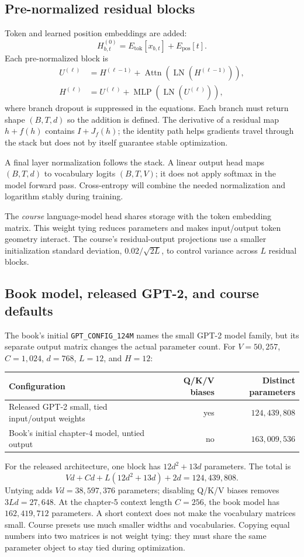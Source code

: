 \documentclass[11pt]{article}
\begin{document}
\subsection{Pre-normalized residual blocks}

Token and learned position embeddings are added:
\[
H^{(0)}_{b,t}=E_{\mathrm{tok}}[x_{b,t}]+E_{\mathrm{pos}}[t].
\]
Each pre-normalized block is
\begin{align*}
U^{(\ell)} &= H^{(\ell-1)}+\operatorname{Attn}
(\operatorname{LN}(H^{(\ell-1)})),\\
H^{(\ell)} &= U^{(\ell)}+\operatorname{MLP}
(\operatorname{LN}(U^{(\ell)})),
\end{align*}
where branch dropout is suppressed in the equations. Each branch must return
shape $(B,T,d)$ so the addition is defined. The derivative of a residual map
$h+f(h)$ contains $I+J_f(h)$; the identity path helps gradients travel through
the stack but does not by itself guarantee stable optimization.


A final layer normalization follows the stack. A linear output head maps
$(B,T,d)$ to vocabulary logits $(B,T,V)$; it does not apply softmax in the model
forward pass. Cross-entropy will combine the needed normalization and logarithm
stably during training.

The \emph{course} language-model head shares storage with the token embedding matrix. This
weight tying reduces parameters and makes input/output token geometry interact.
The course's residual-output projections use a smaller initialization standard deviation,
$0.02/\sqrt{2L}$, to control variance across $L$ residual blocks.

\subsection{Book model, released GPT-2, and course defaults}
The book's initial \texttt{GPT\_CONFIG\_124M} names the small GPT-2 model family,
but its separate output matrix changes the actual parameter count. For
$V=50{,}257$, $C=1{,}024$, $d=768$, $L=12$, and $H=12$:
\begin{center}\small
\begin{tabularx}{\linewidth}{@{}Xrr@{}}
\toprule
Configuration & Q/K/V biases & Distinct parameters \\
\midrule
Released GPT-2 small, tied input/output weights & yes & $124{,}439{,}808$ \\
Book's initial chapter-4 model, untied output & no & $163{,}009{,}536$ \\
\bottomrule
\end{tabularx}\end{center}
For the released architecture, one block has $12d^2+13d$ parameters. The total is
\[
Vd+Cd+L(12d^2+13d)+2d=124{,}439{,}808.
\]
Untying adds $Vd=38{,}597{,}376$ parameters; disabling Q/K/V biases removes
$3Ld=27{,}648$. At the chapter-5 context length $C=256$, the book model has
$162{,}419{,}712$ parameters. A short context does not make the vocabulary
matrices small. Course presets use much smaller widths and vocabularies.
Copying equal numbers into two matrices is not weight tying: they must share
the same parameter object to stay tied during optimization.
\end{document}
